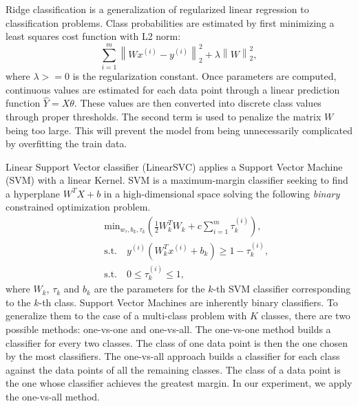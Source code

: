 Ridge classification is a generalization of regularized linear regression to classification problems.
Class probabilities are estimated by first minimizing a least squares cost function with L2 norm:
\begin{equation*}
\sum_{i = 1}^{m} \left\|Wx^{(i)}-y^{(i)}\right\|_2^2 + \lambda \left\|W\right\|_2^2,
\label{eq:ridge-cost}
\end{equation*}
where $\lambda >= 0$ is the regularization constant.
Once parameters are computed, continuous values are estimated for each data point through a linear prediction function $\hat{Y} = X\theta$. 
These values are then converted into discrete class values through proper thresholds.
The second term is used to penalize the matrix $W$ being too large. This will prevent the model from being unnecessarily complicated by overfitting the train data.

Linear Support Vector classifier (LinearSVC) applies a Support Vector Machine (SVM) with a linear Kernel. 
SVM is a maximum-margin classifier seeking to find a hyperplane $W^T X + b$ in a high-dimensional space solving the following \textit{binary} constrained optimization problem.
\begin{eqnarray*}
&&\mathrm{min}_{w_\tau,b_k,\tau_k}(\frac{1}{2}W_k^TW_k +c\sum_{i = 1}^{m} \tau_k^{(i)}), \\
&&\mathrm{s.t.} \quad y^{(i)}(W^T_kx^{(i)}+b_k)\geq 1-\tau_k^{(i)}, \\ 
&&\mathrm{s.t.} \quad 0 \leq \tau_k^{(i)} \leq 1,
\end{eqnarray*}
where $W_k$, $\tau_k$ and $b_k$ are the parameters for the $k$-th SVM classifier corresponding to the $k$-th class.
Support Vector Machines are inherently binary classifiers. To generalize them to the case of a multi-class problem with $K$ classes, there are two possible methods: one-vs-one and one-vs-all. The one-vs-one method builds a classifier for every two classes. The class of one data point is then the one chosen by the most classifiers. The one-vs-all approach builds a classifier for each class against the data points of all the remaining classes. The class of a data point is the one whose classifier achieves the greatest margin. In our experiment, we apply the one-vs-all method.